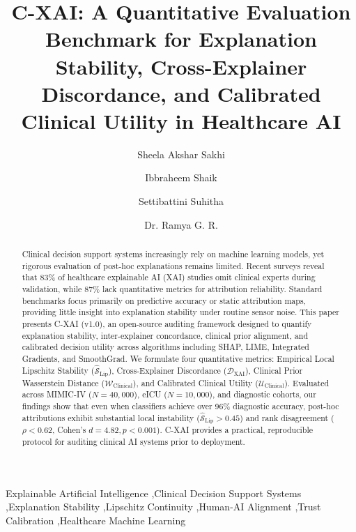 \documentclass[3p,times,procedia]{elsarticle}
\theoremstyle{definition}
\begin{document}
\setlength{\bibsep}{0.8pt}
\begin{frontmatter}

\title{C-XAI: A Quantitative Evaluation Benchmark for Explanation Stability, Cross-Explainer Discordance, and Calibrated Clinical Utility in Healthcare AI}

\author[a]{Sheela Akshar Sakhi} 
\author[a]{Ibbraheem Shaik}
\author[a]{Settibattini Suhitha}
\author[b]{Dr. Ramya G. R.}

\address[a]{Department of Computer Science and Engineering, Amrita School of Computing, Amrita Vishwa Vidyapeetham, Coimbatore, India}
\address[b]{Assistant Professor --- CSE, Amrita School of Computing, Amrita Vishwa Vidyapeetham, Coimbatore, India (Corresponding author: gr\_ramya@cb.amrita.edu)}

\begin{abstract}
Clinical decision support systems increasingly rely on machine learning models, yet rigorous evaluation of post-hoc explanations remains limited. Recent surveys reveal that 83\% of healthcare explainable AI (XAI) studies omit clinical experts during validation, while 87\% lack quantitative metrics for attribution reliability. Standard benchmarks focus primarily on predictive accuracy or static attribution maps, providing little insight into explanation stability under routine sensor noise. This paper presents C-XAI (v1.0), an open-source auditing framework designed to quantify explanation stability, inter-explainer concordance, clinical prior alignment, and calibrated decision utility across algorithms including SHAP, LIME, Integrated Gradients, and SmoothGrad. We formulate four quantitative metrics: Empirical Local Lipschitz Stability ($\widehat{\mathcal{S}}_{\text{Lip}}$), Cross-Explainer Discordance ($\mathcal{D}_{\text{XAI}}$), Clinical Prior Wasserstein Distance ($\mathcal{W}_{\text{Clinical}}$), and Calibrated Clinical Utility ($\mathcal{U}_{\text{Clinical}}$). Evaluated across MIMIC-IV ($N=40,000$), eICU ($N=10,000$), and diagnostic cohorts, our findings show that even when classifiers achieve over 96\% diagnostic accuracy, post-hoc attributions exhibit substantial local instability ($\widehat{\mathcal{S}}_{\text{Lip}} > 0.45$) and rank disagreement ($\rho < 0.62$, Cohen's $d = 4.82, p < 0.001$). C-XAI provides a practical, reproducible protocol for auditing clinical AI systems prior to deployment.
\end{abstract}

\begin{keyword}
Explainable Artificial Intelligence \sep Clinical Decision Support Systems \sep Explanation Stability \sep Lipschitz Continuity \sep Human-AI Alignment \sep Trust Calibration \sep Healthcare Machine Learning
\end{keyword}
\end{frontmatter}
\end{document}
